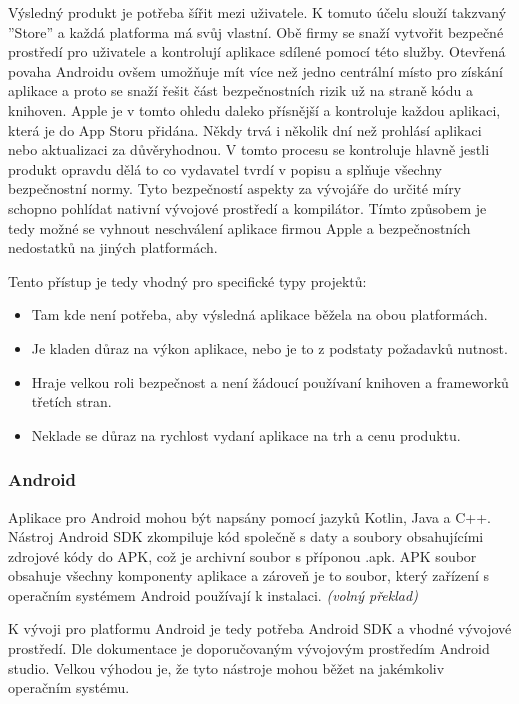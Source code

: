 \documentclass[
  biblatex,
  glossaries,
  index
]{kidiplom}
\begin{document}
Výsledný produkt je potřeba šířit mezi uživatele. K tomuto účelu slouží takzvaný ''Store'' a každá platforma má svůj vlastní. Obě firmy se snaží vytvořit bezpečné prostředí pro uživatele a kontrolují aplikace sdílené pomocí této služby. Otevřená povaha Androidu ovšem umožňuje mít více než jedno centrální místo pro získání aplikace a proto se snaží řešit část bezpečnostních rizik už na straně kódu a knihoven. Apple je v tomto ohledu daleko přísnější a kontroluje každou aplikaci, která je do App Storu přidána. Někdy trvá i několik dní než prohlásí aplikaci nebo aktualizaci za důvěryhodnou. V tomto procesu se kontroluje hlavně jestli produkt opravdu dělá to co vydavatel tvrdí v popisu a splňuje všechny bezpečnostní normy. Tyto bezpečností aspekty za vývojáře do určité míry schopno pohlídat nativní vývojové prostředí a kompilátor. Tímto způsobem je tedy možné se vyhnout neschválení aplikace firmou Apple a bezpečnostních nedostatků na jiných platformách.

Tento přístup je tedy vhodný pro specifické typy projektů:
\begin{itemize}
	\item Tam kde není potřeba, aby výsledná aplikace běžela na obou platformách.
  	\item Je kladen důraz na výkon aplikace, nebo je to z podstaty požadavků nutnost.
  	\item Hraje velkou roli bezpečnost a není žádoucí používaní knihoven a frameworků třetích stran. 
  	\item Neklade se důraz na rychlost vydaní aplikace na trh a cenu produktu.
 \end{itemize}

\subsubsection{Android}
Aplikace pro Android mohou být napsány pomocí jazyků Kotlin, Java a C++. Nástroj Android SDK zkompiluje kód společně s daty a soubory obsahujícími zdrojové kódy do APK, což je archivní soubor s příponou .apk. APK soubor obsahuje všechny komponenty aplikace a zároveň je to soubor, který zařízení s operačním systémem Android používají k instalaci.
\cite{1}
\textit{(volný překlad)}

K vývoji pro platformu Android je tedy potřeba Android SDK a vhodné vývojové prostředí. Dle dokumentace je doporučovaným vývojovým prostředím Android studio. Velkou výhodou je, že tyto nástroje mohou běžet na jakémkoliv operačním systému.
\end{document}
